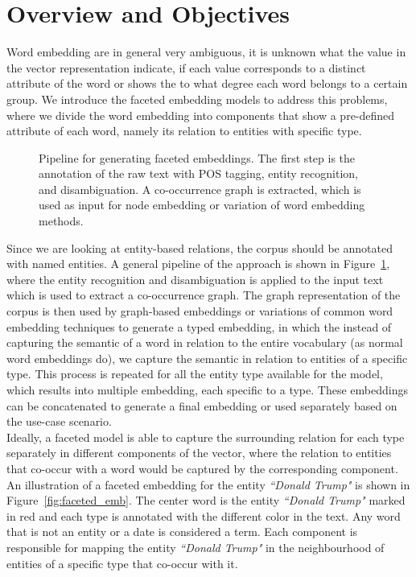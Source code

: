 \section{Overview and Objectives}\label{sec:faceted_overview}
Word embedding are in general very ambiguous, it is unknown what the value in the vector representation indicate, if each value corresponds to a distinct attribute of the word or shows the to what degree each word belongs to a certain group. We introduce the faceted embedding models to address this problems, where we divide the word embedding into components that show a pre-defined attribute of each word, namely its relation to entities with specific type. 
\begin{figure}
\centering 
\resizebox{0.97\textwidth}{0.16\textwidth}{      

}
\caption{Pipeline for generating faceted embeddings. The first step is the annotation of the raw text with POS tagging, entity recognition, and disambiguation. A co-occurrence graph is extracted, which is used as input for node embedding or variation of word embedding methods.   }
\label{fig:facetted_pipeline}
\end{figure}
Since we are looking at entity-based relations, the corpus should be annotated with named entities. A general pipeline of the approach is shown in Figure~\ref{fig:facetted_pipeline}, where the entity recognition and disambiguation is applied to the input text which is used to extract a co-occurrence graph. The graph representation of the corpus is then used by graph-based embeddings or variations of common word embedding techniques to generate a typed embedding, in which the instead of capturing the semantic of a word in relation to the entire vocabulary (as normal word embeddings do), we capture the semantic in relation to entities of a specific type. This process is repeated for all the entity type available for the model, which results into multiple embedding, each specific to a type. These embeddings can be concatenated to generate a final embedding or used separately based on the use-case scenario. \\
Ideally, a faceted model is able to capture the surrounding relation for each type separately in different components of the vector, where the relation to entities that co-occur with a word would be captured by the corresponding component. An illustration of a faceted embedding for the entity \emph{``Donald Trump"} is shown in Figure~\ref{fig:faceted_emb}. The center word is the entity \emph{``Donald Trump"} marked in red and each type is annotated with the different color in the text. Any word that is not an entity or a date is considered a term. Each component is responsible for mapping the entity \emph{``Donald Trump"} in the neighbourhood of entities of a specific type that co-occur with it. \\
